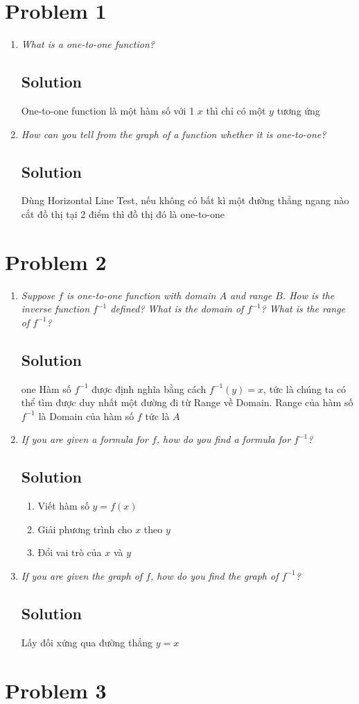 \documentclass[11pt]{article}
\newcommand{\soln}{\subsection*}
\newcommand{\qn}{\textit}
\begin{document}
\section*{Problem 1}

\begin{enumerate}
	\item \qn{What is a one-to-one function?}
	\soln{Solution}
	One-to-one function là một hàm số với 1 $x$ thì chỉ có một $y$ tương ứng
	
	\item \qn{How can you tell from the graph of a function whether it is one-to-one?}
	\soln{Solution}
	Dùng Horizontal Line Test, nếu không có bất kì một đường thẳng ngang nào cắt đồ thị tại 2 điểm thì đồ thị đó là one-to-one
\end{enumerate}

\section*{Problem 2}

\begin{enumerate}
	\item \qn{Suppose $f$ is one-to-one function with domain $A$ and range $B$. How is the inverse function $f^{-1}$ defined? What is the domain of $f^{-1}$? What is the range of $f^{-1}$?}
	\soln{Solution}one
	Hàm số $f^{-1}$ được định nghĩa bằng cách $f^{-1}(y)=x$, tức là chúng ta có thể tìm được duy nhất một đường đi từ Range về Domain. Range của hàm số $f^{-1}$ là Domain của hàm số $f$ tức là $A$
	
	\item \qn{If you are given a formula for $f$, how do you find a formula for $f^{-1}$?}
	\soln{Solution}
	\begin{enumerate}
		\item Viết hàm số $y=f(x)$
		\item Giải phương trình cho $x$ theo $y$
		\item Đổi vai trò của $x$ và $y$
	\end{enumerate}
	
	\item \qn{If you are given the graph of $f$, how do you find the graph of $f^{-1}$?}
	\soln{Solution}
	Lấy đối xứng qua đường thẳng $y=x$
\end{enumerate}

\section*{Problem 3}
\end{document}
